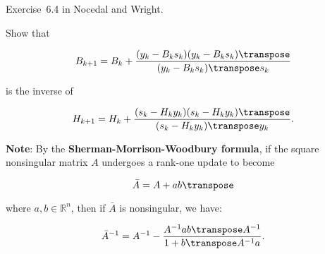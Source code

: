 \begin{problem}\label{prob:02}%
  Exercise~6.4 in Nocedal and Wright.
  
  Show that
  
  \[ B_{k+1} = B_{k} + \frac{(y_k-B_{k}s_{k})(y_k-B_{k}s_{k})\transpose}{(y_k-B_{k}s_{k})\transpose s_k} \]
  
  is the inverse of 
   
  \[ H_{k+1} = H_k + \frac{(s_k-H_{k}y_{k})(s_k-H_{k}y_{k})\transpose}{(s_k-H_{k}y_{k})\transpose y_k} \text{.}\]
  
  \textbf{Note}: \textnormal{By the \textbf{Sherman-Morrison-Woodbury formula}, if the square nonsingular matrix $A$ undergoes a rank-one update to become}
  
  \[\bar{A} = A + ab\transpose\]
  
  \textnormal{where $a,b\in \mathbb{R}^n$, then if $\bar{A}$ is nonsingular, we have:}
  
  \[\bar{A}^{-1} = A^{-1} - \frac{A^{-1}ab\transpose A^{-1}}{1+b\transpose A^{-1}a} \text{.} \]
\end{problem}


